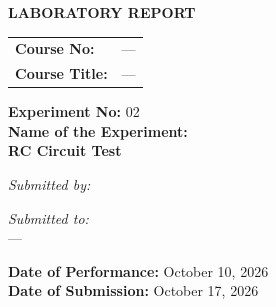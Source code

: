 \documentclass[12pt,a4paper]{article}
\begin{document}
\begin{titlepage}
    \sffamily
    \centering
    \vspace*{1cm}
    
    
    
    
    \Large \textbf{LABORATORY REPORT} \\
    \vspace{1cm}
    
    \begin{tabular}{ll}
        \textbf{Course No:} & — \\
        \textbf{Course Title:} & — \\
    \end{tabular}
    
    \vspace{2cm}
    
    \textbf{Experiment No:} 02 \\
    \vspace{0.5cm}
    \textbf{Name of the Experiment:} \\
    \Large \textbf{ RC Circuit Test } \\
    
    \vspace{2.5cm}
    
    \begin{minipage}[t]{0.4\textwidth}
        \begin{flushleft} \large
            \emph{Submitted by:}\\
            
            
            
        \end{flushleft}
    \end{minipage}
    \hfill
    \begin{minipage}[t]{0.5\textwidth}
        \begin{flushright} \large
            \emph{Submitted to:} \\
            
            — \\
            
        \end{flushright}
    \end{minipage}

    \vfill
    \textbf{Date of Performance:} October 10, 2026 \\
    \textbf{Date of Submission:} October 17, 2026
    
\end{titlepage}
\end{document}
